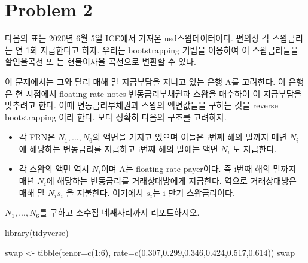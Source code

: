 \documentclass[
  a4paper,
  DIV=11,
  numbers=noendperiod]{scrreprt}
\newenvironment{Shaded}{\begin{snugshade}}{\end{snugshade}}
\newcommand{\AttributeTok}[1]{\textcolor[rgb]{0.40,0.45,0.13}{#1}}
\newcommand{\DecValTok}[1]{\textcolor[rgb]{0.68,0.00,0.00}{#1}}
\newcommand{\FloatTok}[1]{\textcolor[rgb]{0.68,0.00,0.00}{#1}}
\newcommand{\FunctionTok}[1]{\textcolor[rgb]{0.28,0.35,0.67}{#1}}
\newcommand{\NormalTok}[1]{\textcolor[rgb]{0.00,0.23,0.31}{#1}}
\newcommand{\OtherTok}[1]{\textcolor[rgb]{0.00,0.23,0.31}{#1}}
\newcommand{\SpecialCharTok}[1]{\textcolor[rgb]{0.37,0.37,0.37}{#1}}
\providecommand{\tightlist}{%
  \setlength{\itemsep}{0pt}\setlength{\parskip}{0pt}}\usepackage{longtable,booktabs,array}
\begin{document}
\section*{Problem 2}\label{problem-2-1}


다음의 표는 2020년 6월 5일 ICE에서 가져온 usd스왑데이터이다. 편의상 각
스왑금리는 연 1회 지급한다고 하자. 우리는 bootstrapping 기법을 이용하여
이 스왑금리들을 할인율곡선 또 는 현물이자율 곡선으로 변환할 수 있다.

이 문제에서는 그와 달리 매해 말 지급부담을 지니고 있는 은행 A를
고려한다. 이 은행은 현 시점에서 floating rate notes 변동금리부채권과
스왑을 매수하여 이 지급부담을 맞추려고 한다. 이때 변동금리부채권과
스왑의 액면값들을 구하는 것을 reverse bootstrapping 이라 한다. 보다
정확히 다음의 구조를 고려하자.

\begin{itemize}
\tightlist
\item
  각 FRN은 \(N_1, ... , N_6\)의 액면을 가지고 있으며 이들은 i번째 해의
  말까지 매년 \(N_i\) 에 해당하는 변동금리를 지급하고 i번째 해의 말에는
  액면 \(N_i\) 도 지급한다.
\item
  각 스왑의 액면 역시 \(N_i\)이며 A는 floating rate payer이다. 즉 i번째
  해의 말까지 매년 \(N_i\)에 해당하는 변동금리를 거래상대방에게
  지급한다. 역으로 거래상대방은 매해 말 \(N_is_i\) 을 지불한다. 여기에서
  \(s_i\)는 i 만기 스왑금리이다.
\end{itemize}

\(N_1,...,N_6\)를 구하고 소수점 네째자리까지 리포트하시오.

\begin{Shaded}
\begin{Highlighting}[]
\FunctionTok{library}\NormalTok{(tidyverse)}
\end{Highlighting}
\end{Shaded}

\begin{Shaded}
\begin{Highlighting}[]
\NormalTok{swap }\OtherTok{\textless{}{-}} \FunctionTok{tibble}\NormalTok{(}\AttributeTok{tenor=}\FunctionTok{c}\NormalTok{(}\DecValTok{1}\SpecialCharTok{:}\DecValTok{6}\NormalTok{),}
               \AttributeTok{rate=}\FunctionTok{c}\NormalTok{(}\FloatTok{0.307}\NormalTok{,}\FloatTok{0.299}\NormalTok{,}\FloatTok{0.346}\NormalTok{,}\FloatTok{0.424}\NormalTok{,}\FloatTok{0.517}\NormalTok{,}\FloatTok{0.614}\NormalTok{))}
\NormalTok{swap}
\end{Highlighting}
\end{Shaded}
\end{document}
